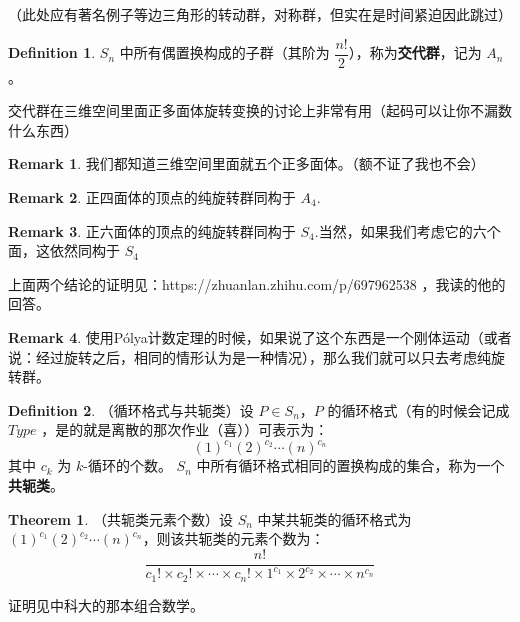 \documentclass[oneside]{book}
\theoremstyle{definition}
\newtheorem{definition}{Definition}[section]
\newtheorem{theorem}{Theorem}[section]
\newtheorem{remark}{Remark}[section]
\begin{document}
	（此处应有著名例子等边三角形的转动群，对称群，但实在是时间紧迫因此跳过）
	\begin{definition}
		\( S_n \) 中所有偶置换构成的子群（其阶为 \( \dfrac{n!}{2} \)），称为\textbf{交代群}，记为 \( A_n \)。
	\end{definition}
	交代群在三维空间里面正多面体旋转变换的讨论上非常有用（起码可以让你不漏数什么东西）
	\begin{remark}
		我们都知道三维空间里面就五个正多面体。（额不证了我也不会）
	\end{remark}
	\begin{remark}
		正四面体的顶点的纯旋转群同构于 \(A_4\).
	\end{remark}
	\begin{remark}
		正六面体的顶点的纯旋转群同构于 \(S_4\).当然，如果我们考虑它的六个面，这依然同构于 \(S_4\)
	\end{remark}
	上面两个结论的证明见：https://zhuanlan.zhihu.com/p/697962538 ，我读的他的回答。
	\begin{remark}
		使用Pólya计数定理的时候，如果说了这个东西是一个刚体运动（或者说：经过旋转之后，相同的情形认为是一种情况），那么我们就可以只去考虑纯旋转群。
	\end{remark}
	\begin{definition}
		\label{def:cycle-format}  
		（循环格式与共轭类）设 \( P \in S_n \)，\( P \) 的循环格式（有的时候会记成 \(Type\) ，是的就是离散的那次作业（喜））可表示为：  
		\[
		(1)^{c_1} (2)^{c_2} \cdots (n)^{c_n}
		\]  
		其中 \( c_k \) 为 \( k \)-循环的个数。  
		\( S_n \) 中所有循环格式相同的置换构成的集合，称为一个\textbf{共轭类}。  
	\end{definition}  
	
	
	\begin{theorem}  
		\label{thm:conjugacy-class-count}  
		（共轭类元素个数）设 \( S_n \) 中某共轭类的循环格式为 \( (1)^{c_1} (2)^{c_2} \cdots (n)^{c_n} \)，则该共轭类的元素个数为：  
		\[
		\frac{n!}{c_1! \times c_2! \times \cdots \times c_n! \times 1^{c_1} \times 2^{c_2} \times \cdots \times n^{c_n}}
		\]  
	\end{theorem}
	证明见中科大的那本组合数学。
\end{document}
